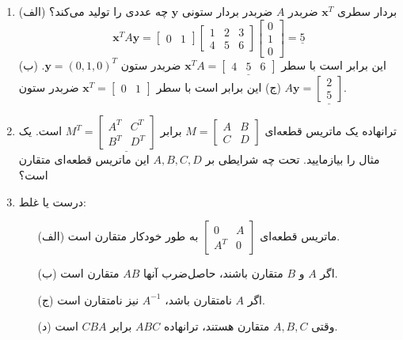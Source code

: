 \documentclass[12pt, a4paper]{book}
\begin{document}
\begin{enumerate}
		\item (الف) بردار سطری $\mathbf{x}^T$ ضربدر $A$ ضربدر بردار ستونی $\mathbf{y}$ چه عددی را تولید می‌کند؟
		\[ \mathbf{x}^TA\mathbf{y} = \begin{bmatrix} 0 & 1 \end{bmatrix} \begin{bmatrix} 1 & 2 & 3 \\ 4 & 5 & 6 \end{bmatrix} \begin{bmatrix} 0 \\ 1 \\ 0 \end{bmatrix} = \underline{5} \]
		(ب) این برابر است با سطر $\mathbf{x}^TA = \underline{\begin{bmatrix} 4 & 5 & 6 \end{bmatrix}}$ ضربدر ستون $\mathbf{y}=(0,1,0)^T$.
		(ج) این برابر است با سطر $\mathbf{x}^T = \begin{bmatrix} 0 & 1 \end{bmatrix}$ ضربدر ستون $A\mathbf{y} = \underline{\begin{bmatrix} 2 \\ 5 \end{bmatrix}}$.
		
		\item ترانهاده یک ماتریس قطعه‌ای $M = \begin{bmatrix} A & B \\ C & D \end{bmatrix}$ برابر $M^T = \underline{\begin{bmatrix} A^T & C^T \\ B^T & D^T \end{bmatrix}}$ است. یک مثال را بیازمایید. تحت چه شرایطی بر $A,B,C,D$ این ماتریس قطعه‌ای متقارن است؟
		
		\item درست یا غلط:
		\begin{itemize}
			\item[(الف)] ماتریس قطعه‌ای $\begin{bmatrix} 0 & A \\ A^T & 0 \end{bmatrix}$ به طور خودکار متقارن است.
			\item[(ب)] اگر $A$ و $B$ متقارن باشند، حاصل‌ضرب آنها $AB$ متقارن است.
			\item[(ج)] اگر $A$ نامتقارن باشد، $A^{-1}$ نیز نامتقارن است.
			\item[(د)] وقتی $A, B, C$ متقارن هستند، ترانهاده $ABC$ برابر $CBA$ است.
		\end{itemize}
		

\end{enumerate}
\end{document}

